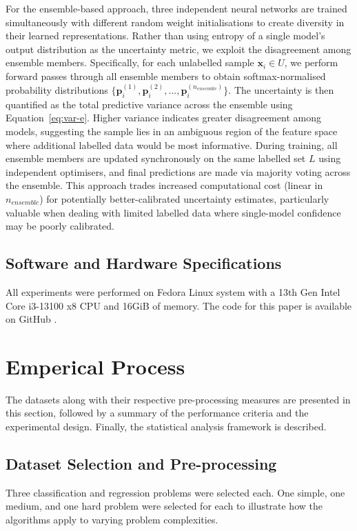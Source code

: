 \documentclass[10pt, conference]{IEEEtran}
\begin{document}
For the ensemble-based approach, three independent neural networks are trained simultaneously with different random weight initialisations to create diversity in their learned representations. Rather than using entropy of a single model's output distribution as the uncertainty metric, we exploit the disagreement among ensemble members. Specifically, for each unlabelled sample $\mathbf{x}_i \in U$, we perform forward passes through all ensemble members to obtain softmax-normalised probability distributions $\{\mathbf{p}^{(1)}_i, \mathbf{p}^{(2)}_i, ..., \mathbf{p}^{(n_{ensemble})}_i\}$. The uncertainty is then quantified as the total predictive variance across the ensemble using Equation~\ref{eq:var-e}. Higher variance indicates greater disagreement among models, suggesting the sample lies in an ambiguous region of the feature space where additional labelled data would be most informative. During training, all ensemble members are updated synchronously on the same labelled set $L$ using independent optimisers, and final predictions are made via majority voting across the ensemble. This approach trades increased computational cost (linear in $n_{ensemble}$) for potentially better-calibrated uncertainty estimates, particularly valuable when dealing with limited labelled data where single-model confidence may be poorly calibrated.

\subsection{Software and Hardware Specifications}
All experiments were performed on Fedora Linux system with a 13th Gen Intel Core i3-13100 x8 CPU and 16GiB of memory. The code for this paper is available on GitHub \cite{github}.



\section{Emperical Process}
The datasets along with their respective pre-processing measures are presented in this section, followed by a summary of the performance criteria and the experimental design. Finally, the statistical analysis framework is described.
\subsection{Dataset Selection and Pre-processing}
Three classification and regression problems were selected each. One simple, one medium, and one hard problem were selected for each to illustrate how the algorithms apply to varying problem complexities.
\end{document}
